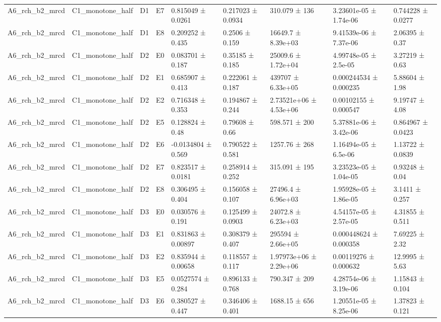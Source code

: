 \begin{table}
\begin{tabular}{lllllllll}
A6\_rch\_b2\_mrcd & C1\_monotone\_half & D1 & E7 & 0.815049 ± 0.0261 & 0.217023 ± 0.0934 & 310.079 ± 136 & 3.23601e-05 ± 1.74e-06 & 0.744228 ± 0.0277 \\
A6\_rch\_b2\_mrcd & C1\_monotone\_half & D1 & E8 & 0.209252 ± 0.435 & 0.2506 ± 0.159 & 16649.7 ± 8.39e+03 & 9.41539e-06 ± 7.37e-06 & 2.06395 ± 0.37 \\
A6\_rch\_b2\_mrcd & C1\_monotone\_half & D2 & E0 & 0.083701 ± 0.187 & 0.35185 ± 0.185 & 25009.6 ± 1.72e+04 & 4.99748e-05 ± 2.5e-05 & 3.27219 ± 0.63 \\
A6\_rch\_b2\_mrcd & C1\_monotone\_half & D2 & E1 & 0.685907 ± 0.413 & 0.222061 ± 0.187 & 439707 ± 6.33e+05 & 0.000244534 ± 0.000235 & 5.88604 ± 1.98 \\
A6\_rch\_b2\_mrcd & C1\_monotone\_half & D2 & E2 & 0.716348 ± 0.353 & 0.194867 ± 0.244 & 2.73521e+06 ± 4.53e+06 & 0.00102155 ± 0.000547 & 9.19747 ± 4.08 \\
A6\_rch\_b2\_mrcd & C1\_monotone\_half & D2 & E5 & 0.128824 ± 0.48 & 0.79608 ± 0.66 & 598.571 ± 200 & 5.37881e-06 ± 3.42e-06 & 0.864967 ± 0.0423 \\
A6\_rch\_b2\_mrcd & C1\_monotone\_half & D2 & E6 & -0.0134804 ± 0.569 & 0.790522 ± 0.581 & 1257.76 ± 268 & 1.16494e-05 ± 6.5e-06 & 1.13722 ± 0.0839 \\
A6\_rch\_b2\_mrcd & C1\_monotone\_half & D2 & E7 & 0.823517 ± 0.0181 & 0.258914 ± 0.252 & 315.091 ± 195 & 3.23523e-05 ± 1.04e-05 & 0.93248 ± 0.04 \\
A6\_rch\_b2\_mrcd & C1\_monotone\_half & D2 & E8 & 0.306495 ± 0.404 & 0.156058 ± 0.107 & 27496.4 ± 6.96e+03 & 1.95928e-05 ± 1.86e-05 & 3.1411 ± 0.257 \\
A6\_rch\_b2\_mrcd & C1\_monotone\_half & D3 & E0 & 0.030576 ± 0.191 & 0.125499 ± 0.0903 & 24072.8 ± 6.23e+03 & 4.54157e-05 ± 2.57e-05 & 4.31855 ± 0.511 \\
A6\_rch\_b2\_mrcd & C1\_monotone\_half & D3 & E1 & 0.831863 ± 0.00897 & 0.308379 ± 0.407 & 295594 ± 2.66e+05 & 0.000448624 ± 0.000358 & 7.69225 ± 2.32 \\
A6\_rch\_b2\_mrcd & C1\_monotone\_half & D3 & E2 & 0.835944 ± 0.00658 & 0.118557 ± 0.117 & 1.97973e+06 ± 2.29e+06 & 0.00119276 ± 0.000632 & 12.9995 ± 5.63 \\
A6\_rch\_b2\_mrcd & C1\_monotone\_half & D3 & E5 & 0.0527574 ± 0.284 & 0.896133 ± 0.768 & 790.347 ± 209 & 4.28754e-06 ± 3.19e-06 & 1.15843 ± 0.104 \\
A6\_rch\_b2\_mrcd & C1\_monotone\_half & D3 & E6 & 0.380527 ± 0.447 & 0.346406 ± 0.401 & 1688.15 ± 656 & 1.20551e-05 ± 8.25e-06 & 1.37823 ± 0.121 \\

\end{tabular}
\end{table}
